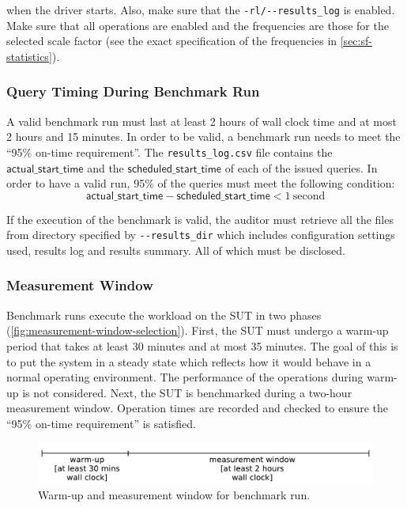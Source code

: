 \begin{description}
    when the driver starts. Also, make sure that the \verb|-rl/--results_log| is enabled. Make sure that all operations are enabled and the frequencies are those for the selected scale factor (see the exact specification of the frequencies in \autoref{sec:sf-statistics}).
\end{description}

\subsubsection{Query Timing During Benchmark Run}
\label{sec:ontime-requirements}
A valid benchmark run must last at least 2 hours of wall clock time and at most 2 hours and 15 minutes.
In order to be valid, a benchmark run needs to meet the ``95\% on-time requirement''.
The \texttt{results\_log.csv} file contains the $\mathsf{actual\_start\_time}$ and the $\mathsf{scheduled\_start\_time}$ of each of the issued queries. In order to have a valid run, 95\% of the queries must meet the following condition:
\begin{equation*}
\mathsf{actual\_start\_time} - \mathsf{scheduled\_start\_time} < 1\
\mathrm{second}
\end{equation*}

If the execution of the benchmark is valid, the auditor must retrieve all the files from directory specified by \verb|--results_dir| which includes configuration settings used, results log and results summary. All of which must be disclosed.

\subsubsection{Measurement Window}
\label{sec:int-measurement-window}

Benchmark runs execute the workload on the SUT in two phases (\autoref{fig:measurement-window-selection}).
First, the SUT must undergo a warm-up period that takes at least 30 minutes and at most 35 minutes. The goal of this is to put the system in a steady state which reflects how it would behave in a normal operating environment. The performance of the operations during warm-up is not considered.
Next, the SUT is benchmarked during a two-hour measurement window. Operation times are recorded and checked to ensure the ``95\% on-time requirement'' is satisfied.

\begin{figure}[h]
    \centering
    \includegraphics[width=.7\linewidth]{figures/measurement-window-selection}
    \caption{Warm-up and measurement window for benchmark run.}
    \label{fig:measurement-window-selection}
\end{figure}

